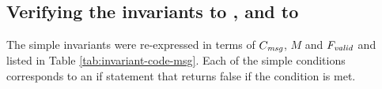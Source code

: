 \begin{algorithm}[ht]
\begin{algorithmic}[1]
\EndFunction
\end{algorithmic}
\end{algorithm}

\subsection{Verifying the invariants  to , and  to }
\label{sec:m-invariant-checks}

The simple invariants were re-expressed in terms of $C_\emph{msg}$, $M$ and $F_\emph{valid}$ and listed in Table \ref{tab:invariant-code-msg}. Each of the simple conditions corresponds to an if statement that returns false if the condition is met.

